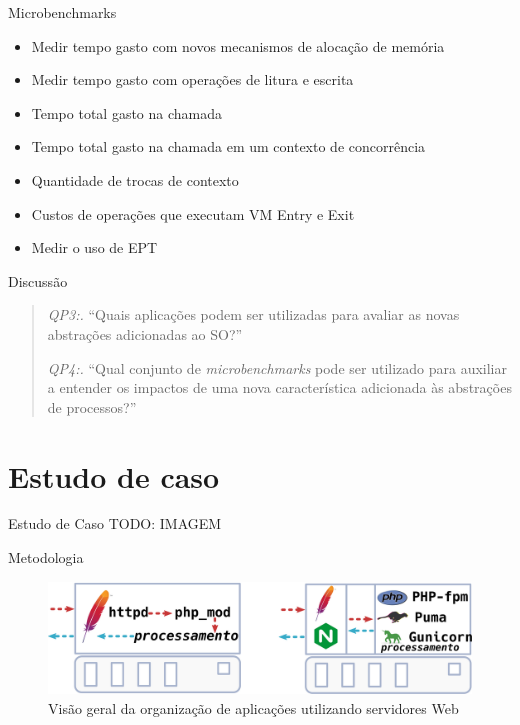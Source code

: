 \documentclass[xcolor={usenames,svgnames,dvipsnames},brazil,english,12pt,aspectratio=149]{beamer}
\begin{document}
\begin{frame}{Microbenchmarks}

  \begin{itemize}
    \item Medir tempo gasto com novos mecanismos de alocação de memória
    \item Medir tempo gasto com operações de litura e escrita
    \item Tempo total gasto na chamada
    \item Tempo total gasto na chamada em um contexto de concorrência
    \item Quantidade de trocas de contexto
    \item Custos de operações que executam VM Entry e Exit
    \item Medir o uso de EPT
  \end{itemize}

\end{frame}

\begin{frame}{Discussão}
  \begin{quote}
    \item \emph{QP3:.} ``Quais aplicações podem ser utilizadas para avaliar as novas abstrações adicionadas ao SO?''
    \item \emph{QP4:.} ``Qual conjunto de \emph{microbenchmarks} pode ser utilizado para auxiliar a entender os impactos de uma nova característica adicionada às abstrações de processos?''
  \end{quote}
\end{frame}

\section{Estudo de caso}

\begin{frame}{Estudo de Caso}
  TODO: IMAGEM
\end{frame}

\begin{frame}{Metodologia}
  \begin{figure}[!h] \centering
    \includegraphics[width=\textwidth]{web_server_organization_strategy}
    \caption*{Visão geral da organização de aplicações utilizando servidores Web}
  \end{figure}
\end{frame}
\end{document}

